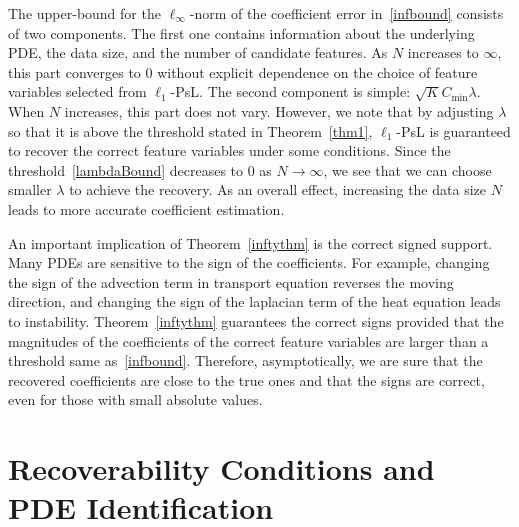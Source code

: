 \documentclass[a4paper,11pt]{article}
\begin{document}
The upper-bound for the $\ell_\infty$-norm of the coefficient error in~\eqref{infbound} consists of two components. The first one contains information about the underlying PDE, the data size, and the number of candidate features. As $N$ increases to $\infty$, this part converges to $0$ without explicit dependence on the choice of feature variables selected from $\ell_1$-PsL. The second component is simple: $\sqrt{K}C_{\min}\lambda$. When $N$ increases, this part does not vary. However, we note that by adjusting $\lambda$ so that it is above the threshold stated in Theorem~\ref{thm1}, $\ell_1$-PsL is guaranteed to recover the correct feature variables under some conditions. Since the threshold~\eqref{lambdaBound} decreases to $0$ as $N\to\infty$, we see that we can choose smaller $\lambda$ to achieve the recovery. As an overall effect,  increasing the data size $N$ leads to more accurate coefficient estimation.

An important implication of Theorem~\ref{inftythm} is the correct signed support. Many PDEs are sensitive to the sign of the coefficients. For example, changing the sign of the advection term in transport equation reverses the moving direction, and changing the sign of the laplacian term of the heat equation leads to instability.  Theorem~\ref{inftythm} guarantees the correct signs provided that the magnitudes of the coefficients of the correct feature variables are larger than a threshold same as~\ref{infbound}. Therefore, asymptotically, we are sure that the recovered coefficients are close to the true ones and that the signs are correct, even for those with small absolute values.
\section{Recoverability Conditions and PDE Identification}
\end{document}
